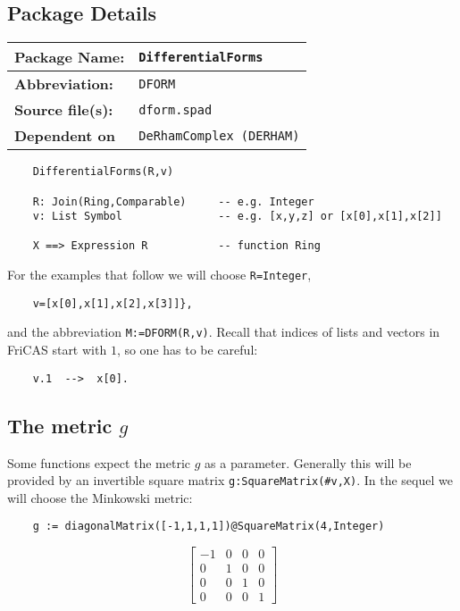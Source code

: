 \documentclass[12pt,a4paper]{article}
\begin{document}
\subsection{Package Details}
%

\begin{tabular}{|l|l|}
   \hline 
   {\bf Package Name:} & {\tt DifferentialForms} \\ 
   \hline 
   {\bf Abbreviation:} & {\tt DFORM} \\ 
   \hline 
   {\bf Source file(s):} & {\tt dform.spad} \\ 
   \hline 
   {\bf Dependent on} & {\tt DeRhamComplex (DERHAM)} \\ 
   \hline 
   \end{tabular}    
%
\begin{lstlisting}
    DifferentialForms(R,v) 
    
    R: Join(Ring,Comparable)     -- e.g. Integer
    v: List Symbol               -- e.g. [x,y,z] or [x[0],x[1],x[2]]

    X ==> Expression R           -- function Ring   
\end{lstlisting}
%
For the examples that follow we will choose {\tt R=Integer}, 
\begin{verbatim}
    v=[x[0],x[1],x[2],x[3]]},
\end{verbatim}
and the abbreviation {\tt M:=DFORM(R,v)}. Recall that indices of lists
and vectors in FriCAS start with $1$, so one has to be careful:
\begin{verbatim}
    v.1  -->  x[0].
\end{verbatim}
%

\subsection{The metric $g$}
Some functions expect the metric $g$ as a parameter. Generally this
will be provided by an invertible square matrix 
{\tt g:SquareMatrix(\#v,X)}. 
In the sequel we will choose the Minkowski metric:
%
\begin{lstlisting}    
    g := diagonalMatrix([-1,1,1,1])@SquareMatrix(4,Integer)
\end{lstlisting}   

\begin{displaymath}
	 \left[
  \begin{array}{cccc}
  -1 & 0 & 0 & 0 \\
  0 & 1 & 0 & 0 \\
  0 & 0 & 1 & 0 \\
  0 & 0 & 0 & 1
  \end{array}
  \right]
\end{displaymath}
%
\end{document}
